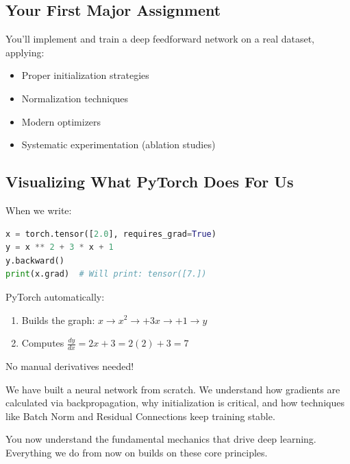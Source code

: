 \documentclass{article}
\begin{document}
\subsection{Your First Major Assignment}
You'll implement and train a deep feedforward network on a real dataset, applying:
\begin{itemize}
    \item Proper initialization strategies
    \item Normalization techniques
    \item Modern optimizers
    \item Systematic experimentation (ablation studies)
\end{itemize}


\subsection{Visualizing What PyTorch Does For Us}

When we write:
\begin{lstlisting}[language=Python]
x = torch.tensor([2.0], requires_grad=True)
y = x ** 2 + 3 * x + 1
y.backward()
print(x.grad)  # Will print: tensor([7.])
\end{lstlisting}

PyTorch automatically:
\begin{enumerate}
    \item Builds the graph: $x \rightarrow x^2 \rightarrow +3x \rightarrow +1 \rightarrow y$
    \item Computes $\frac{dy}{dx} = 2x + 3 = 2(2) + 3 = 7$
\end{enumerate}

No manual derivatives needed!






\begin{tcolorbox}[colback=yellow!5!white, colframe=orange!50!black, title=Congrats!]
We have built a neural network from scratch. We understand how gradients are calculated via backpropagation, why initialization is critical, and how techniques like Batch Norm and Residual Connections keep training stable.

You now understand the fundamental mechanics that drive deep learning. Everything we do from now on builds on these core principles.
\end{tcolorbox}



\newpage
\end{document}
